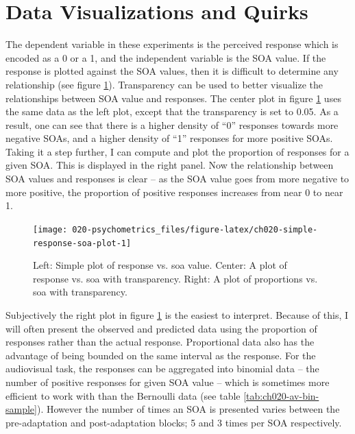 \documentclass[11pt, oneside, openany]{scrbook}
\begin{document}
\hypertarget{data-visualizations-and-quirks}{%
\section{Data Visualizations and Quirks}\label{data-visualizations-and-quirks}}

The dependent variable in these experiments is the perceived response which is encoded as a 0 or a 1, and the independent variable is the SOA value. If the response is plotted against the SOA values, then it is difficult to determine any relationship (see figure \ref{fig:ch020-simple-response-soa-plot}). Transparency can be used to better visualize the relationships between SOA value and responses. The center plot in figure \ref{fig:ch020-simple-response-soa-plot} uses the same data as the left plot, except that the transparency is set to 0.05. As a result, one can see that there is a higher density of ``0'' responses towards more negative SOAs, and a higher density of ``1'' responses for more positive SOAs. Taking it a step further, I can compute and plot the proportion of responses for a given SOA. This is displayed in the right panel. Now the relationship between SOA values and responses is clear -- as the SOA value goes from more negative to more positive, the proportion of positive responses increases from near 0 to near 1.

\begin{figure}

{\centering \texttt{[image: 020-psychometrics\_files/figure-latex/ch020-simple-response-soa-plot-1]} 

}

\caption{Left: Simple plot of response vs. soa value. Center: A plot of response vs. soa with transparency. Right: A plot of proportions vs. soa with transparency.}\label{fig:ch020-simple-response-soa-plot}
\end{figure}

Subjectively the right plot in figure \ref{fig:ch020-simple-response-soa-plot} is the easiest to interpret. Because of this, I will often present the observed and predicted data using the proportion of responses rather than the actual response. Proportional data also has the advantage of being bounded on the same interval as the response. For the audiovisual task, the responses can be aggregated into binomial data -- the number of positive responses for given SOA value -- which is sometimes more efficient to work with than the Bernoulli data (see table \ref{tab:ch020-av-bin-sample}). However the number of times an SOA is presented varies between the pre-adaptation and post-adaptation blocks; 5 and 3 times per SOA respectively.
\end{document}
